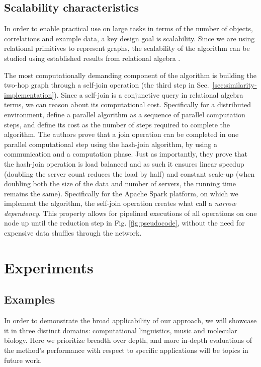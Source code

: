 \documentclass{kais}
\begin{document}
\subsection{Scalability characteristics}
\label{sec:scalability-theory}
In order to enable practical use on large tasks in terms of the number of objects, correlations and example data,
a key design goal is scalability. Since we are using
relational primitives to represent graphs,
the scalability of the algorithm can be studied using established results from
relational algebra \cite{Chandra77,Bitton83}. 

The most computationally demanding component of the algorithm is
building the two-hop graph through a self-join operation (the third step in Sec.\ \ref{sec:similarity-implementation}).
Since a self-join is a conjunctive query \cite{Chandra77} in relational algebra terms,
we can reason about its computational cost.
Specifically for a distributed environment, 
define a parallel algorithm as a sequence of parallel computation steps, and define its
cost as the number of steps required to complete the algorithm.
The authors prove that a join operation can be completed in one parallel computational
step using the hash-join algorithm, by using a communication and a computation phase.
Just as importantly, they prove that the hash-join operation is load balanced
and as such it ensures linear speedup (doubling the server count reduces the load by
half) and constant scale-up (when doubling both the size of the data and number of servers, the running time remains the same).
Specifically for the Apache Spark platform, on which we implement the algorithm,
the self-join operation creates what 
call a \textit{narrow dependency}. This property allows for pipelined executions
of all operations on one node up until the reduction step in Fig. \ref{fig:pseudocode}, without the need for expensive data shuffles
through the network.

\section{Experiments}
\label{sec:experiments}

\subsection{Examples}
In order to demonstrate the broad applicability of our approach, we will showcase it in three distinct 
domains: computational linguistics, music and molecular biology. Here we prioritize breadth over depth, and more in-depth evaluations 
of the method's performance with respect to specific applications will be topics in future work.
\end{document}
